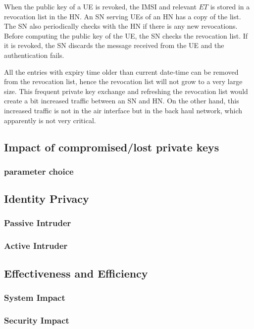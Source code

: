 \documentclass{river-journal}
\begin{document}
When the public key of a UE is revoked, the IMSI and relevant $ET$ is stored in a revocation list in the HN.  An SN serving UEs of an HN has a copy of the list. The SN also periodically checks with the HN if there is any new revocations. Before computing the public key of the UE, the SN checks the revocation list. If it is revoked, the SN discards the message received from the UE and the authentication fails. 

All the entries with expiry time older than current date-time can be removed from the revocation list, hence the revocation list will not grow to a very large size. This frequent private key exchange and refreshing the revocation list would create a bit increased traffic between an SN and HN. On the other hand, this increased traffic is not in the air interface but in the back haul network, which apparently is not very critical. 


\subsection{Impact of compromised/lost private keys}

\subsubsection{parameter choice}

\subsection{Identity Privacy}

\subsubsection{Passive Intruder}

\subsubsection{Active Intruder}

\subsection{Effectiveness and Efficiency}

\subsubsection{System Impact}

\subsubsection{Security Impact}
\end{document}
